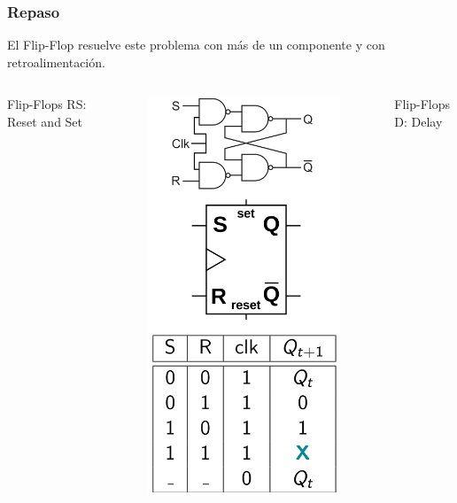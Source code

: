 \documentclass[10pt]{beamer}
\begin{document}
\begin{frame}
\frametitle{Repaso}
\begin{mdframed}[backgroundcolor=frenchblue!20]
  El Flip-Flop resuelve este problema con m\'as de un componente y con retroalimentaci\'on.
\end{mdframed}
\vspace{0.2cm}
\begin{columns}
        Flip-Flops RS: Reset and Set

         \begin{figure}[h!]
             \centering
             \includegraphics[scale=0.18]{flipRS.png}
         \end{figure}
        Flip-Flops D: Delay


\end{columns}
\end{frame}
\end{document}
